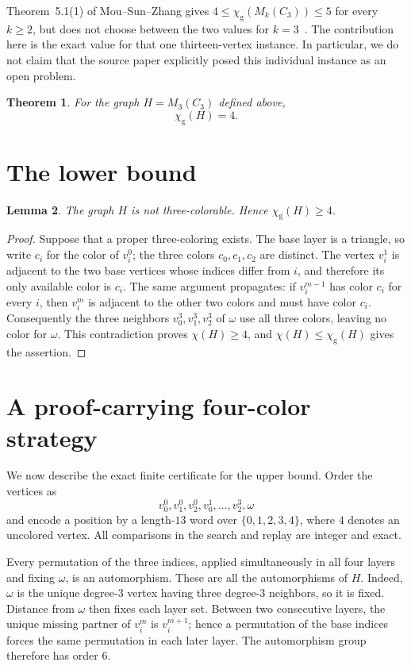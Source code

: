 \documentclass[11pt]{article}
\newtheorem{theorem}{Theorem}
\newtheorem{lemma}[theorem]{Lemma}
\newcommand{\chig}{\chi_{\mathrm g}}
\begin{document}
Theorem~5.1(1) of Mou--Sun--Zhang gives
$4\leq\chig(M_k(C_3))\leq5$ for every $k\geq2$, but does not choose between
the two values for $k=3$~\cite{MouSunZhang2026}.  The contribution here is the
exact value for that one thirteen-vertex instance.  In particular, we do not
claim that the source paper explicitly posed this individual instance as an
open problem.

\begin{theorem}\label{thm:main}
For the graph $H=M_3(C_3)$ defined above,
\[
                         \chig(H)=4.
\]
\end{theorem}

\section{The lower bound}

\begin{lemma}\label{lem:lower}
The graph $H$ is not three-colorable.  Hence $\chig(H)\geq4$.
\end{lemma}

\begin{proof}
Suppose that a proper three-coloring exists.  The base layer is a triangle, so
write $c_i$ for the color of $v_i^0$; the three colors $c_0,c_1,c_2$ are
distinct.  The vertex $v_i^1$ is adjacent to the two base vertices whose
indices differ from $i$, and therefore its only available color is $c_i$.
The same argument propagates: if $v_i^{m-1}$ has color $c_i$ for every $i$,
then $v_i^m$ is adjacent to the other two colors and must have color $c_i$.
Consequently the three neighbors $v_0^3,v_1^3,v_2^3$ of $\omega$ use all
three colors, leaving no color for $\omega$.  This contradiction proves
$\chi(H)\geq4$, and $\chi(H)\leq\chig(H)$ gives the assertion.
\end{proof}

\section{A proof-carrying four-color strategy}

We now describe the exact finite certificate for the upper bound.  Order the
vertices as
\[
 v_0^0,v_1^0,v_2^0,v_0^1,\ldots,v_2^3,\omega
\]
and encode a position by a length-$13$ word over
$\{0,1,2,3,4\}$, where $4$ denotes an uncolored vertex.  All comparisons in
the search and replay are integer and exact.

Every permutation of the three indices, applied simultaneously in all four
layers and fixing $\omega$, is an automorphism.  These are all the
automorphisms of $H$.  Indeed, $\omega$ is the unique degree-$3$ vertex having
three degree-$3$ neighbors, so it is fixed.  Distance from $\omega$ then fixes
each layer set.  Between two consecutive layers, the unique missing partner
of $v_i^m$ is $v_i^{m+1}$; hence a permutation of the base indices forces the
same permutation in each later layer.  The automorphism group therefore has
order $6$.
\end{document}

